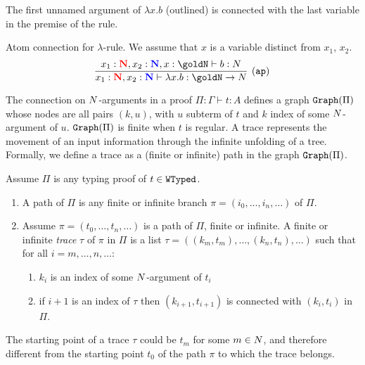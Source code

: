 The first unnamed argument of $\lambda x.b$ (outlined)
is connected with the last variable in the premise of the rule.


\begin{Eg}\label{eg:4}%
Atom connection for  $\lambda$-rule.
We assume that $x$ is  a variable distinct from $x_1$, $x_2$.
\[
\infer[(\ap)]{
  x_1: \bfColor{red}{\N}, x_2: \bfColor{blue}{\N}
  \prove \lambda x.b : \goldN \rightarrow \N
}{
  x_1: \bfColor{red}{\N}, x_2: \bfColor{blue}{\N}, x:\goldN \prove b : \N
}
\]
\end{Eg}




The connection on ${N}$-arguments in a proof $\Pi:\Gamma\vdash t:A$ defines a 
graph ${\tt Graph}(\Pi)$ whose nodes are all pairs $(k,u)$, with $u$ subterm of $t$ and 
$k$ index of some ${N}$-argument of  $u$. ${\tt Graph}(\Pi)$ is finite when $t$ is 
regular. A trace represents the movement of an input information through the 
infinite unfolding of a tree. Formally, we define a trace as a (finite or infinite) path 
in the graph ${\tt Graph}(\Pi)$.

\begin{definition}
Assume $\Pi$ is any typing proof of $t \in {\tt WTyped}$.
\begin{enumerate}
\item
A path of $\Pi$ is any finite or infinite branch $\pi =(i_0, \ldots, i_n, \ldots)$ of $\Pi$.

\item
Assume $\pi =(t_0, \ldots, t_n, \ldots)$ is a path of $\Pi$, finite or infinite. 
A finite or infinite \emph{trace} $\tau$ of $\pi$ in $\Pi$ is a list 
$\tau =( (k_m,t_m), \ldots, (k_n,t_n), \ldots)$ such that for all $i=m,\ldots, n,\ldots$:
\begin{enumerate}
\item
$k_i$ is an index of some ${N}$-argument of $t_i$
\item
if $i+1$ is an index of $\tau$ then $(k_{i+1},t_{i+1})$ is connected with $(k_i, t_i)$ in $\Pi$.
\end{enumerate}

\end{enumerate}
\end{definition}

The starting point of a trace $\tau$ could be $t_m$ for some $m \in {N}$, 
and therefore different from the starting point $t_0$ of the path $\pi$ to which the 
trace belongs.


